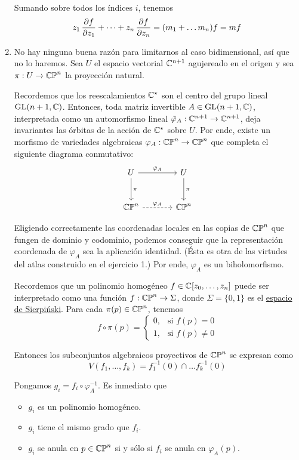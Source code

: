 \begin{solution}
\begin{enumerate}[label=\alph*)]
    Sumando sobre todos los índices $i$, tenemos
    $$z_1 \, \frac {\partial f} {\partial z_1} + \dots + z_n \, \frac {\partial f} {\partial z_n} = (m_1 + \dots m_n) f = mf$$
    
    \item No hay ninguna buena razón para limitarnos al caso bidimensional, así que no lo haremos. Sea $U$ el espacio vectorial $\mathbb C^{n+1}$ agujereado en el origen y sea $\pi : U \to \mathbb {CP}^n$ la proyección natural.
    
    Recordemos que los reescalamientos $\mathbb C^\star$ son el centro del grupo lineal $\operatorname{GL}(n+1, \mathbb C)$. Entonces, toda matriz invertible $A \in \operatorname{GL}(n+1, \mathbb C)$, interpretada como un automorfismo lineal $\tilde \varphi_A : \mathbb C^{n+1} \to \mathbb C^{n+1}$, deja invariantes las órbitas de la acción de $\mathbb C^\star$ sobre $U$. Por ende, existe un morfismo de variedades algebraicas $\varphi_A : \mathbb {CP}^n \to \mathbb {CP}^n$ que completa el siguiente diagrama conmutativo:
    $$
    \begin{tikzcd}[row sep=large, column sep=large]
        U \arrow[r, "\tilde \varphi_A"] \arrow[d, "\pi"] & U \arrow[d, "\pi"] \\
        \CP^n \arrow[r, dashed, "\varphi_A"] & \CP^n
    \end{tikzcd}
    $$
    
    Eligiendo correctamente las coordenadas locales en las copias de $\mathbb {CP}^n$ que fungen de dominio y codominio, podemos conseguir que la representación coordenada de $\varphi_A$ sea la aplicación identidad. (Ésta es otra de las virtudes del atlas construido en el ejercicio 1.) Por ende, $\varphi_A$ es un biholomorfismo.
    
    Recordemos que un polinomio homogéneo $f \in \mathbb C[z_0, \dots, z_n]$ puede ser interpretado como una función $f : \mathbb {CP}^n \to \Sigma$, donde $\Sigma = \{ 0, 1 \}$ es el \href{https://en.wikipedia.org/wiki/Sierpi\%C5\%84ski_space}{espacio de Sierpiński}. Para cada $\pi(p) \in \mathbb {CP}^n$, tenemos
    $$
    f \circ \pi(p) =
        \begin{cases}
            0, & \text{si } f(p) = 0 \\
            1, & \text{si } f(p) \ne 0
        \end{cases}
    $$
    
    Entonces los subconjuntos algebraicos proyectivos de $\mathbb {CP}^n$ se expresan como
    $$V(f_1, \dots, f_k) = f_1^{-1}(0) \cap \dots f_k^{-1}(0)$$
    
    Pongamos $g_i = f_i \circ \varphi_A^{-1}$. Es inmediato que
    \begin{itemize}
        \item $g_i$ es un polinomio homogéneo.
        \item $g_i$ tiene el mismo grado que $f_i$.
        \item $g_i$ se anula en $p \in \mathbb {CP}^n$ si y sólo si $f_i$ se anula en $\varphi_A(p)$.
    \end{itemize}
    

\end{enumerate}
\end{solution}
